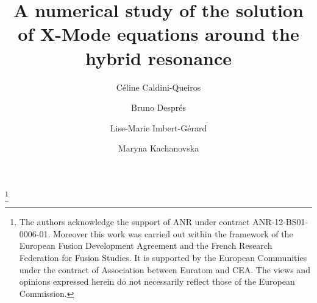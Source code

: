 \documentclass[proc]{edpsmath}
\begin{document}
\newcommand{\urev}[1]{{\color{red}#1}}
\newcommand{\mrev}[1]{{\color{blue}#1}}

\title{A numerical study of the
	solution of X-Mode equations around the hybrid resonance}
\thanks{\rm The authors acknowledge 
	the support
	of ANR under contract ANR-12-BS01-0006-01. Moreover 
	this work was carried out within the framework of the European Fusion Development Agreement and 
	the French Research Federation for Fusion Studies. 
	It is supported by the European Communities under the contract of Association between Euratom and CEA. 
	The views and opinions expressed herein do not necessarily reflect those of the European Commission.} %
%
\author{C\'eline Caldini-Queiros}\address{Max Planck Institute für PlasmaPhysik, Garching bei Muenchen}
\author{Bruno Despr\'es}\address{Laboratoire Jacques-Louis Lions, University PARIS 6}
\author{Lise-Marie Imbert-Gérard}\address{Courant Institute of Mathematical Sciences, New York University}
\author{Maryna Kachanovska}\address{POEMS, INRIA, ENSTA ParisTech, Paris}


%
%
\begin{abstract}

\end{abstract}
%
\begin{resume} 

\end{resume}
%
%
\maketitle


%


%



\end{document}
